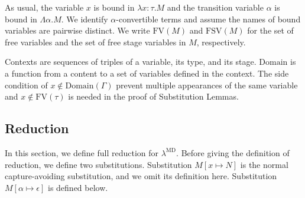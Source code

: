 \documentclass[runningheads]{llncs}
\newcommand{\LMD}{$\lambda^{\textrm{MD}}$\xspace}
\newcommand{\G}{\Gamma}
\newcommand{\FV}{\text{FV}}
\newcommand{\FTV}{\text{FSV}}
\begin{document}
As usual, the variable $x$ is bound in $\lambda x:\tau.M$
and the transition variable $\alpha$ is bound in $\Lambda \alpha.M$.
We identify $\alpha$-convertible terms and assume the names of bound variables are pairwise distinct.
We write $\FV(M)$ and $\FTV(M)$ for the set of free variables and the set of free stage variables in $M$, respectively.

Contexts are sequences of triples of a variable, its type, and its stage.
$\textrm{Domain}$ is a function from a content to a set of variables defined in the context.
The side condition of $x\not\in\textrm{Domain}(\G)$ prevent multiple appearances of the same variable and
$x\not\in\textrm{FV}(\tau)$ is needed in the proof of Substitution Lemmas.

\subsection{Reduction}

In this section, we define full reduction for \LMD.
Before giving the definition of reduction, we define two substitutions.
Substitution $M[x\mapsto N]$ is the normal capture-avoiding substitution, and we omit its definition here.
Substitution $M[\alpha \mapsto \epsilon]$ is defined below.
\end{document}
